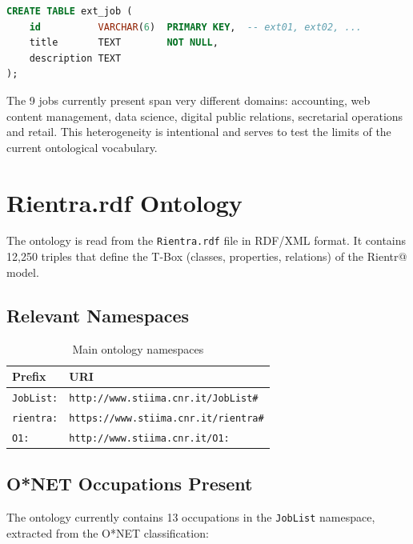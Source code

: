 \documentclass[12pt, a4paper]{report}
\begin{document}
\begin{lstlisting}[language=SQL, caption={Schema of the ext\_job table}]
CREATE TABLE ext_job (
    id          VARCHAR(6)  PRIMARY KEY,  -- ext01, ext02, ...
    title       TEXT        NOT NULL,
    description TEXT
);
\end{lstlisting}

The 9 jobs currently present span very different domains:
accounting, web content management, data science, digital public
relations, secretarial operations and retail. This
heterogeneity is intentional and serves to test the limits of the
current ontological vocabulary.

\section{Rientra.rdf Ontology}

The ontology is read from the \texttt{Rientra.rdf} file in
RDF/XML format. It contains 12,250 triples that define the T-Box
(classes, properties, relations) of the Rientr@ model.

\subsection{Relevant Namespaces}

\begin{table}[H]
\centering
\begin{tabular}{ll}
\toprule
\textbf{Prefix} & \textbf{URI} \\
\midrule
\texttt{JobList:} & \texttt{http://www.stiima.cnr.it/JobList\#} \\
\texttt{rientra:} & \texttt{https://www.stiima.cnr.it/rientra\#} \\
\texttt{O1:}      & \texttt{http://www.stiima.cnr.it/O1:} \\
\bottomrule
\end{tabular}
\caption{Main ontology namespaces}
\end{table}

\subsection{O*NET Occupations Present}

The ontology currently contains 13 occupations in the
\texttt{JobList} namespace, extracted from the O*NET classification:
\end{document}

